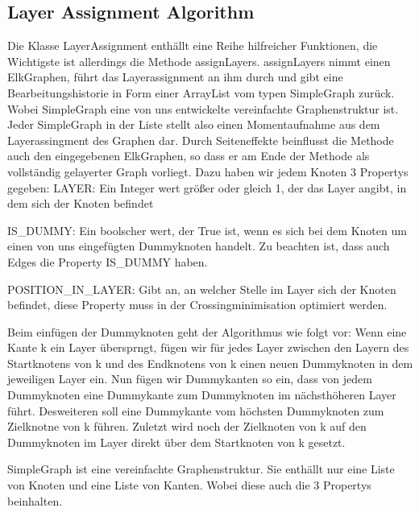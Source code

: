 

\subsection*{Layer Assignment Algorithm}
Die Klasse LayerAssignment enthällt eine Reihe hilfreicher Funktionen, die Wichtigste ist allerdings die Methode assignLayers. assignLayers nimmt einen ElkGraphen, führt das Layerassignment an ihm durch und gibt eine Bearbeitungshistorie in Form einer ArrayList vom typen SimpleGraph zurück. Wobei SimpleGraph eine von uns entwickelte vereinfachte Graphenstruktur ist. Jeder SimpleGraph in der Liste stellt also einen Momentaufnahme aus dem Layerassingment des Graphen dar.
Durch Seiteneffekte beinflusst die Methode auch den eingegebenen ElkGraphen, so dass er am Ende der Methode als vollständig gelayerter Graph vorliegt. Dazu haben wir jedem Knoten 3 Propertys gegeben:
 LAYER: Ein Integer wert größer oder gleich 1, der das Layer angibt, in dem sich der Knoten befindet

IS\_DUMMY: Ein boolscher wert, der True ist, wenn es sich bei dem Knoten um einen von uns eingefügten Dummyknoten handelt. Zu beachten ist, dass auch Edges die Property IS\_DUMMY haben.

POSITION\_IN\_LAYER: Gibt an, an welcher Stelle im Layer sich der Knoten befindet, diese Property muss in der Crossingminimisation optimiert werden.

Beim einfügen der Dummyknoten geht der Algorithmus wie folgt vor:
Wenn eine Kante k ein Layer übersprngt, fügen wir für jedes Layer zwischen den Layern des Startknotens von k und des Endknotens von k einen neuen Dummyknoten in dem jeweiligen Layer ein. Nun fügen wir Dummykanten so ein, dass von jedem Dummyknoten eine Dummykante zum Dummyknoten im nächsthöheren Layer führt. Desweiteren soll eine Dummykante vom höchsten Dummyknoten zum Zielknotne von k führen. Zuletzt wird noch der Zielknoten von k auf den Dummyknoten im Layer direkt über dem Startknoten von k gesetzt.

SimpleGraph ist eine vereinfachte Graphenstruktur. Sie enthällt nur eine Liste von Knoten und eine Liste von Kanten.  Wobei diese auch die 3 Propertys beinhalten.














